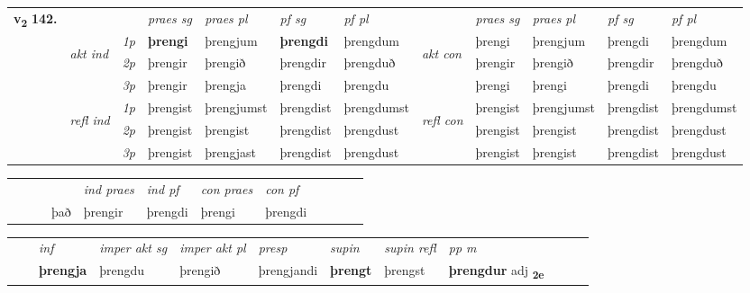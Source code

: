 \begin{tabular}{llllllllllll} \toprule
\multirow{4}{*}{{{\textbf{v{\textsubscript{2}}} \Large{\textbf{142.}}}}}  & &   &  \textit{praes sg}  & \textit{praes pl}  &\textit{ pf sg} & \textit{pf pl} &  &  \textit{praes sg}  & \textit{praes pl}  & \textit{pf sg} & \textit{pf pl } \\*
	\cmidrule{4-7} \cmidrule{9-12}
 & \multirow{3}{*}{\begin{turn}{90}\textit{akt ind}\end{turn}} & {\textit{1p}} & \textbf{þrengi} & þrengjum    & \textbf{þrengdi} & þrengdum & \multirow{3}{*}{\begin{turn}{90}\textit{akt con}\end{turn}} &þrengi & þrengjum & þrengdi & þrengdum\\*
& &  {\textit{2p}} &  þrengir  & þrengið   & þrengdir & þrengduð & & þrengir & þrengið & þrengdir & þrengduð \\*
& &  {\textit{3p}} & þrengir & þrengja   & þrengdi & þrengdu & & þrengi & þrengi& þrengdi & þrengdu  \\*
\cmidrule{4-7} \cmidrule{9-12}
 &\multirow{3}{*}{\begin{turn}{90}\textit{refl ind}\end{turn}} & {\textit{1p}} & þrengist & þrengjumst    & þrengdist & þrengdumst & \multirow{3}{*}{\begin{turn}{90}\textit{refl con}\end{turn}}  &þrengist & þrengjumst & þrengdist & þrengdumst\\*
 &&  {\textit{2p}} &  þrengist  & þrengist   & þrengdist & þrengdust & &þrengist & þrengist & þrengdist & þrengdust \\*
& &  {\textit{3p}} & þrengist & þrengjast   & þrengdist & þrengdust & & þrengist & þrengist& þrengdist & þrengdust  \\*
\cmidrule{4-7} \cmidrule{9-12}
\end{tabular}


\begin{tabular}{llllllllllll}
 & &  & &  \textit{ind praes} & \textit{ind pf} & \textit{con praes} & \textit{con pf} \\*
&  & & það & þrengir & þrengdi & þrengi & þrengdi \\*
\cmidrule{5-9}
\end{tabular}


\begin{tabular}{llllllllllll}
 & & \textit{inf} & \textit{imper akt sg} & \textit{imper akt pl}   & \textit{presp} & \textit{supin} & \textit{supin refl} & \textit{pp m}     \\*
  & & \textbf{þrengja} & þrengdu  & þrengið   & þrengjandi &  \textbf{þrengt} & þrengst & \textbf{þrengdur} adj \textbf{\textsubscript{2e}} \\*
\cmidrule{1-12}
\end{tabular}



